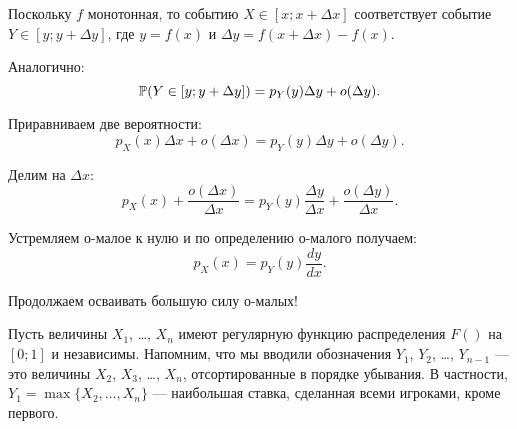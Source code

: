 Поскольку $ f $ монотонная, то событию $X\in [x;x+\Delta x]  $ соответствует событие $Y\in [y;y+\Delta y]$, где $ y=f(x) $ и $ \Delta y= f(x+\Delta x)-f(x) $.

Аналогично:
\begin{equation}
\P(Y\in [y;y+\Delta y])=p_{Y}(y)\Delta y+o(\Delta y).
\end{equation}

Приравниваем две вероятности:
\begin{equation}
p_{X}(x)\Delta x+o(\Delta x)=p_{Y}(y)\Delta y+o(\Delta y).
\end{equation}

Делим на $ \Delta x $:
\begin{equation}
p_{X}(x)+\frac{o(\Delta x)}{\Delta x}=p_{Y}(y)\frac{\Delta y}{\Delta x}+\frac{o(\Delta y)}{\Delta x}.
\end{equation}

Устремляем о-малое к нулю и по определению о-малого получаем:
\begin{equation}
p_{X}(x)=p_{Y}(y)\frac{dy}{dx}.
\end{equation}

Продолжаем осваивать большую силу о-малых!

Пусть величины $ X_{1} $, \ldots, $ X_{n} $ имеют регулярную функцию распределения $ F() $ на $ [0;1] $ и независимы. Напомним, что мы вводили обозначения $ Y_{1} $, $ Y_{2} $, \ldots, $ Y_{n-1} $ — это величины $ X_{2} $, $ X_{3} $, \ldots, $ X_{n} $, отсортированные в порядке убывания. В частности, $ Y_{1}=\max\{X_{2}, \ldots, X_{n}\} $ — наибольшая ставка, сделанная всеми игроками, кроме первого.

